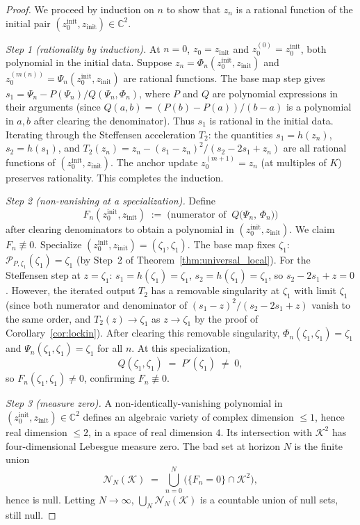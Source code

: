 \documentclass[10pt,a4paper,oneside]{book}
\theoremstyle{definition}
\theoremstyle{remark}
\newcommand{\CC}{\mathbb{C}}
\begin{document}
\begin{proof}
We proceed by induction on $n$ to show that $z_n$ is a rational function of the initial pair $(z_0^{\mathrm{init}}, z_{\mathrm{init}}) \in \CC^2$.

\emph{Step 1 (rationality by induction).}  At $n = 0$, $z_0 = z_{\mathrm{init}}$ and $z_0^{(0)} = z_0^{\mathrm{init}}$, both polynomial in the initial data.  Suppose $z_n = \Phi_n(z_0^{\mathrm{init}}, z_{\mathrm{init}})$ and $z_0^{(m(n))} = \Psi_n(z_0^{\mathrm{init}}, z_{\mathrm{init}})$ are rational functions.  The base map step gives $s_1 = \Psi_n - P(\Psi_n)/Q(\Psi_n, \Phi_n)$, where $P$ and $Q$ are polynomial expressions in their arguments (since $Q(a,b) = (P(b)-P(a))/(b-a)$ is a polynomial in $a, b$ after clearing the denominator).  Thus $s_1$ is rational in the initial data.  Iterating through the Steffensen acceleration $T_2$: the quantities $s_1 = h(z_n)$, $s_2 = h(s_1)$, and $T_2(z_n) = z_n - (s_1 - z_n)^2/(s_2 - 2s_1 + z_n)$ are all rational functions of $(z_0^{\mathrm{init}}, z_{\mathrm{init}})$.  The anchor update $z_0^{(m+1)} = z_n$ (at multiples of $K$) preserves rationality.  This completes the induction.

\emph{Step 2 (non-vanishing at a specialization).}  Define
\[
  F_n(z_0^{\mathrm{init}}, z_{\mathrm{init}}) \;:=\; \bigl(\text{numerator of}\;\; Q\!\bigl(\Psi_n,\, \Phi_n\bigr)\bigr)
\]
after clearing denominators to obtain a polynomial in $(z_0^{\mathrm{init}}, z_{\mathrm{init}})$.  We claim $F_n \not\equiv 0$.  Specialize $(z_0^{\mathrm{init}}, z_{\mathrm{init}}) = (\zeta_1, \zeta_1)$.  The base map fixes $\zeta_1$: $\mathcal{P}_{P,\zeta_1}(\zeta_1) = \zeta_1$ (by Step~2 of Theorem~\ref{thm:universal_local}).  For the Steffensen step at $z = \zeta_1$: $s_1 = h(\zeta_1) = \zeta_1$, $s_2 = h(\zeta_1) = \zeta_1$, so $s_2 - 2s_1 + z = 0$.  However, the iterated output $T_2$ has a removable singularity at $\zeta_1$ with limit $\zeta_1$ (since both numerator and denominator of $(s_1 - z)^2/(s_2 - 2s_1 + z)$ vanish to the same order, and $T_2(z) \to \zeta_1$ as $z \to \zeta_1$ by the proof of Corollary~\ref{cor:lockin}).  After clearing this removable singularity, $\Phi_n(\zeta_1, \zeta_1) = \zeta_1$ and $\Psi_n(\zeta_1, \zeta_1) = \zeta_1$ for all $n$.  At this specialization,
\[
  Q(\zeta_1, \zeta_1) \;=\; P'(\zeta_1) \;\neq\; 0,
\]
so $F_n(\zeta_1,\zeta_1) \neq 0$, confirming $F_n \not\equiv 0$.

\emph{Step 3 (measure zero).}  A non-identically-vanishing polynomial in $(z_0^{\mathrm{init}}, z_{\mathrm{init}}) \in \CC^2$ defines an algebraic variety of complex dimension $\leq 1$, hence real dimension $\leq 2$, in a space of real dimension $4$.  Its intersection with $\mathcal{K}^2$ has four-dimensional Lebesgue measure zero.  The bad set at horizon $N$ is the finite union
\[
  \mathcal{N}_N(\mathcal{K}) \;=\; \bigcup_{n=0}^{N} \bigl(\{F_n = 0\} \cap \mathcal{K}^2\bigr),
\]
hence is null.  Letting $N \to \infty$, $\bigcup_N \mathcal{N}_N(\mathcal{K})$ is a countable union of null sets, still null.
\end{proof}
\end{document}
